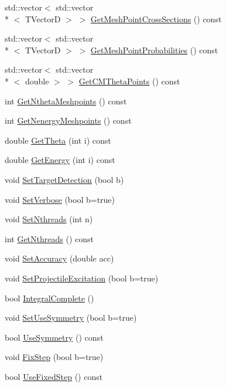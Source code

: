 \begin{DoxyCompactItemize}
std\-::vector$<$ std\-::vector\\*
$<$ T\-Vector\-D $>$ $>$ \hyperlink{classIntegral_afb5537a85f73c946ef995c1c1a59f909}{Get\-Mesh\-Point\-Cross\-Sections} () const 
\item 
std\-::vector$<$ std\-::vector\\*
$<$ T\-Vector\-D $>$ $>$ \hyperlink{classIntegral_a034a680b2e03a448d8a34ca635570833}{Get\-Mesh\-Point\-Probabilities} () const 
\item 
std\-::vector$<$ std\-::vector\\*
$<$ double $>$ $>$ \hyperlink{classIntegral_a79c05e036d4bde6f0a4b58c43609341a}{Get\-C\-M\-Theta\-Points} () const 
\item 
int \hyperlink{classIntegral_a37791a2bc8dd6640b26aa9c360c2d805}{Get\-Ntheta\-Meshpoints} () const 
\item 
int \hyperlink{classIntegral_af7d797162b618f3208c8bef4c9f7eeb7}{Get\-Nenergy\-Meshpoints} () const 
\item 
double \hyperlink{classIntegral_acc8a52e50e9686382b268ac8d1de39e5}{Get\-Theta} (int i) const 
\item 
double \hyperlink{classIntegral_a52dcb2c1604ffa118afd970ca542add8}{Get\-Energy} (int i) const 
\item 
void \hyperlink{classIntegral_a81fa56a28123bee80b550d4f7eb01077}{Set\-Target\-Detection} (bool b)
\item 
void \hyperlink{classIntegral_a8becba09d3bc70a3eb3b6efe2322f2f2}{Set\-Verbose} (bool b=true)
\item 
void \hyperlink{classIntegral_a84f4e01efa07c82a073b7dec58fe0c4e}{Set\-Nthreads} (int n)
\item 
int \hyperlink{classIntegral_a61b3f87d0639f4bf96e9a2fcf9ba4111}{Get\-Nthreads} () const 
\item 
void \hyperlink{classIntegral_a303ccbd05093c67ce911a016bb799392}{Set\-Accuracy} (double acc)
\item 
void \hyperlink{classIntegral_a3d7ffeb56e3b5da4567b7c66e7d495cc}{Set\-Projectile\-Excitation} (bool b=true)
\item 
bool \hyperlink{classIntegral_af4e9c4f0f2e00a52d6651eec01d8109e}{Integral\-Complete} ()
\item 
void \hyperlink{classIntegral_a51c1c84c25d323b4f27f9f70d0ce2318}{Set\-Use\-Symmetry} (bool b=true)
\item 
bool \hyperlink{classIntegral_a90ab017beb6086d40e009cf5d260a9a0}{Use\-Symmetry} () const 
\item 
void \hyperlink{classIntegral_a055018e0bea5e22c5ad09ce1baa919fc}{Fix\-Step} (bool b=true)
\item 
bool \hyperlink{classIntegral_acfb413dfcb3227602102ea73d25a59f1}{Use\-Fixed\-Step} () const 
\end{DoxyCompactItemize}


